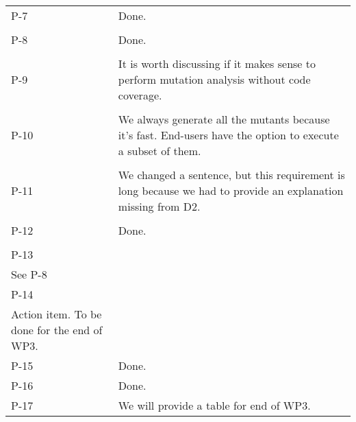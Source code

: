 \begin{longtable}{|p{1.5cm}|p{12cm}|@{}}
P-7&
\begin{minipage}{12cm}
Done.
\end{minipage}\\
\\
\hline

P-8&
\begin{minipage}{12cm}
Done.
\end{minipage}\\
\\
\hline

P-9&
\begin{minipage}{12cm}
It is worth discussing if it makes sense to perform mutation analysis without code coverage.
\end{minipage}\\
\\
\hline


P-10&
\begin{minipage}{12cm}
We always generate all the mutants because it's fast. End-users have the option to execute a subset of them.
\end{minipage}\\
\\
\hline

P-11&
\begin{minipage}{12cm}
We changed a sentence, but this requirement is long because we had to provide an explanation missing from D2.
\end{minipage}\\
\\
\hline

P-12&
\begin{minipage}{12cm}
Done.
\end{minipage}\\
\\
\hline

P-13&
\begin{minipage}{12cm}
\end{minipage}\\
See P-8\\
\hline

P-14&
\begin{minipage}{12cm}
\end{minipage}\\
Action item. To be done for the end of WP3.\\
\hline


P-15&
\begin{minipage}{12cm}
Done.
\end{minipage}\\
\hline

P-16&
\begin{minipage}{12cm}
Done.
\end{minipage}\\
\hline

P-17&
\begin{minipage}{12cm}
We will provide a table for end of WP3.
\end{minipage}\\
\hline
                                                
\end{longtable}
\normalsize

\clearpage